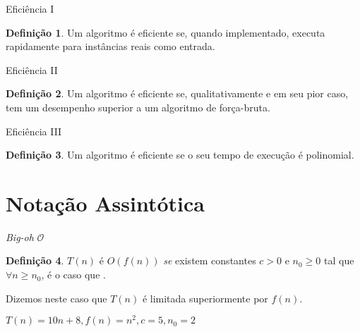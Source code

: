 \documentclass[
    mode=present,
    style=dvn,
    paper=screen,
    display=slidesnotes,
    size=14pt,
]{powerdot}
\theoremstyle{plain}
\theoremstyle{definition}
\newtheorem{defn}{Definição}
\theoremstyle{remark}
\begin{document}
\begin{slide}{Eficiência I}
    \Large
    \begin{defn}
        Um algoritmo é eficiente se, quando implementado, executa rapidamente para instâncias reais como entrada.
    \end{defn}
\end{slide}

\begin{slide}{Eficiência II}
    \Large
    \begin{defn}
        Um algoritmo é eficiente se, qualitativamente e em seu pior caso, tem um desempenho superior a um algoritmo de força-bruta.
    \end{defn}
\end{slide}

\begin{slide}{Eficiência III}
    \Large
    \begin{defn}
        Um algoritmo é eficiente se o seu tempo de execução é polinomial.\pause
    \end{defn}
\end{slide}

\section{Notação Assintótica}

\begin{slide}{\textit{Big-oh} $\mathcal{O}$}
    \begin{defn}
         $T(n)$ é $O(f(n))$ \textit{se} existem constantes $c>0$ e $n_0 \geq 0$ tal que $\forall n \geq n_0$, é o caso que .\pause
    \end{defn}
    Dizemos neste caso que $T(n)$ é limitada superiormente por $f(n)$.
    \bigskip
    \begin{tcolorbox}[title=Exemplo]
        $T(n) = 10n + 8, f(n)=n^2, c = 5, n_0 = 2$ 
    \end{tcolorbox}
\end{slide}
\end{document}

